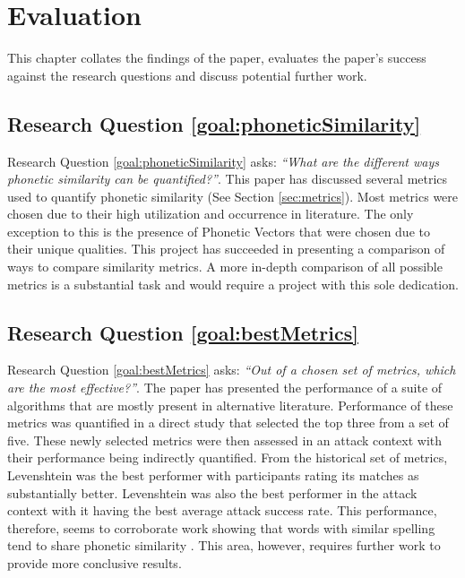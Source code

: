 \chapter{Evaluation}
This chapter collates the findings of the paper, evaluates the paper's success against the research questions and discuss potential further work.

\section{Research Question \ref{goal:phoneticSimilarity}}

Research Question \ref{goal:phoneticSimilarity} asks: \textit{``What are the different ways phonetic similarity can be quantified?''}. This paper has discussed several metrics used to quantify phonetic similarity (See Section \ref{sec:metrics}). Most metrics were chosen due to their high utilization and occurrence in literature. The only exception to this is the presence of Phonetic Vectors that were chosen due to their unique qualities. This project has succeeded in presenting a comparison of ways to compare similarity metrics. A more in-depth comparison of all possible metrics is a substantial task and would require a project with this sole dedication.

\section{Research Question \ref{goal:bestMetrics}}
Research Question \ref{goal:bestMetrics} asks: \textit{``Out of a chosen set of metrics, which are the most effective?''}. 
The paper has presented the performance of a suite of algorithms that are mostly present in alternative literature. Performance of these metrics was quantified in a direct study that selected the top three from a set of five. These newly selected metrics were then assessed in an attack context with their performance being indirectly quantified. From the historical set of metrics, Levenshtein was the best performer with participants rating its matches as substantially better. Levenshtein was also the best performer in the attack context with it having the best average attack success rate. This performance, therefore, seems to corroborate work showing that words with similar spelling tend to share phonetic similarity \cite{hettiarachchi2012sparcl}. This area, however, requires further work to provide more conclusive results.

